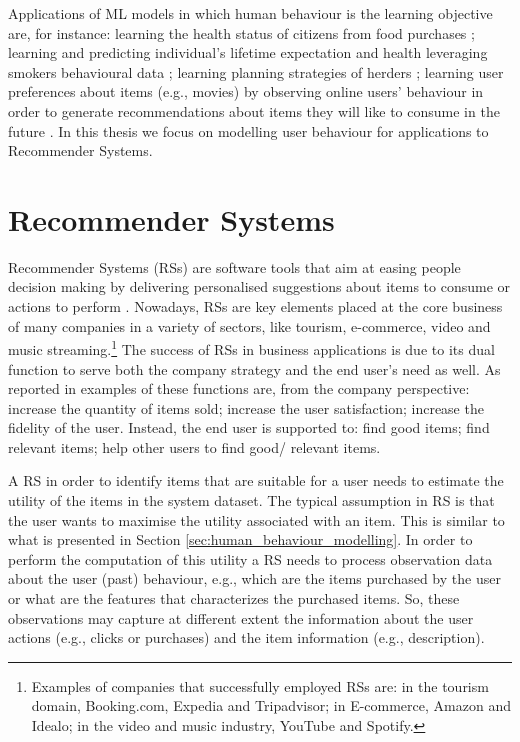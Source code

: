 Applications of ML models in which human behaviour is the learning objective are, for instance: learning the health status of citizens from food purchases \cite{health:aiello:2019}; learning and predicting individual's lifetime expectation and health leveraging smokers behavioural data \cite{smokers:darden:2017}; learning planning strategies of herders \cite{ermon:2015}; learning user preferences about items (e.g., movies) by observing online users' behaviour in order to generate recommendations about items they will like to consume in the future \cite{RSdef:2015}.
In this thesis we focus on modelling user behaviour for applications to Recommender Systems.

\section{Recommender Systems}
\label{sec:recommender_system}
Recommender Systems (RSs) are software tools that aim at easing people 
decision making by delivering personalised suggestions about items to 
consume or actions to perform \cite{RSdef:2015}. 
Nowadays, RSs are key elements 
placed at the core business of many companies in a variety of sectors, like tourism, e-commerce, video and music streaming.\footnote{Examples of companies that successfully employed RSs are: in the tourism domain, Booking.com, Expedia and Tripadvisor; in E-commerce, Amazon and Idealo; in the video and music industry, YouTube and Spotify.}
The success of RSs in business applications is due to its dual function to serve both the company strategy and the end user's need as well. As reported in \cite{RSdef:2015} examples of these functions are, from the company perspective: increase the quantity of items sold; increase the user satisfaction; increase the fidelity of the user. Instead, the end user is supported to: find good items; find relevant items; help other users to find good/ relevant items.  

A RS in order to identify items that are suitable for a user needs to estimate the utility of the items in the system dataset. The typical assumption in RS is that the user wants to maximise the utility associated with an item. This is similar to what is presented in Section \ref{sec:human_behaviour_modelling}. In order to perform the computation of this utility a RS needs to process observation data about the user (past) behaviour, e.g., which are the items purchased by the user or what are the features that characterizes the purchased items. So, these observations may capture at different extent the information about the user actions (e.g., clicks or purchases) and the item information (e.g., description).

